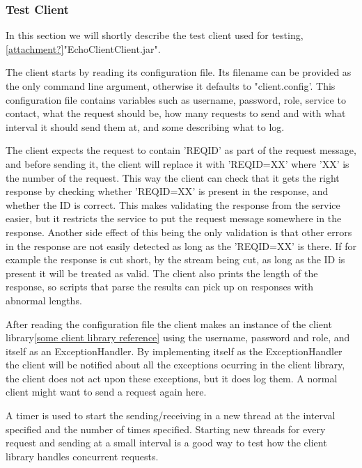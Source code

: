 \subsubsection{Test Client}\label{Testing:About:Client}
    In this section we will shortly describe the test client used for testing, \ref{attachment?}"EchoClientClient.jar".

    The client starts by reading its configuration file. Its filename can be provided as the only command line argument, otherwise it defaults to "client.config'. This configuration file contains variables such as username, password, role, service to contact, what the request should be, how many requests to send and with what interval it should send them at, and some describing what to log.

    The client expects the request to contain '{REQID}' as part of the request message, and before sending it, the client will replace it with '{REQID=XX}' where 'XX' is the number of the request. This way the client can check that it gets the right response by checking whether '{REQID=XX}' is present in the response, and whether the ID is correct. This makes validating the response from the service easier, but it restricts the service to put the request message somewhere in the response. Another side effect of this being the only validation is that other errors in the response are not easily detected as long as the '{REQID=XX}' is there. If for example the response is cut short, by the stream being cut, as long as the ID is present it will be treated as valid. The client also prints the length of the response, so scripts that parse the results can pick up on responses with abnormal lengths.

    After reading the configuration file the client makes an instance of the client library\ref{some client library reference} 
    using the username, password and role, and itself as an ExceptionHandler. By implementing itself as the ExceptionHandler the client will be notified about all the exceptions ocurring in the client library, the client does not act upon these exceptions, but it does log them. A normal client might want to send a request again here.
    
    A timer is used to start the sending/receiving in a new thread at the interval specified and the number of times specified. Starting new threads for every request and sending at a small interval is a good way to test how the client library handles concurrent requests.


